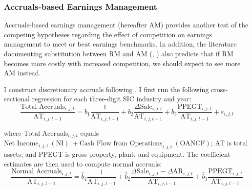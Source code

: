 \documentclass[notitlepage, 12pt]{article}
\begin{document}
\subsubsection{Accruals-based Earnings Management}
Accruals-based earnings management (hereafter AM) provides another test of the competing hypotheses regarding the effect of competition on earnings management to meet or beat earnings benchmarks. In addition, the literature documenting substitution between RM and AM (\citet{zang:2012}, \citet{io:2013b}) also predicts that if RM becomes more costly with increased competition, we should expect to see more AM instead.
\newline

\noindent I construct discretionary accruals following \citet{io:2013}. I first run the following cross-sectional regression for each three-digit SIC industry and year:
\[\dfrac{\text{Total Accruals}_{i,j,t}}{\text{AT}_{i,j,t-1}} = b_{1}\dfrac{1}{\text{AT}_{i,j,t-1}} + b_{2}\dfrac{\Delta\text{Sale}_{i,j,t}}{\text{AT}_{i,j,t-1}} + b_{3}\dfrac{\text{PPEGT}_{i,j,t}}{\text{AT}_{i,j,t-1}} + \varepsilon_{i,j,t}\]

\noindent where $\text{Total Accruals}_{i,j,t}$ equals $\text{Net Income}_{i,j,t} \ (\text{NI}) \ + \text{Cash Flow from Operations}_{i,j,t} \ (\text{OANCF})$; AT is total assets; and PPEGT is gross property, plant, and equipment. The coefficient estimates are then used to compute normal accruals:
\[\dfrac{\text{Normal Accruals}_{i,j,t}}{\text{AT}_{i,j,t-1}} = \widehat{b}_{1}\dfrac{1}{\text{AT}_{i,j,t-1}} + \widehat{b}_{2}\dfrac{\Delta{\text{Sale}}_{i,j,t} - \Delta\text{AR}_{i,j,t}}{\text{AT}_{i,j,t-1}} + \widehat{b}_{3}\dfrac{\text{PPEGT}_{i,j,t}}{\text{AT}_{i,j,t-1}}\]
\end{document}
